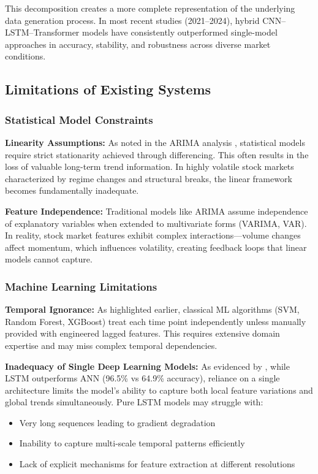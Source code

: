 This decomposition creates a more complete representation of the underlying data generation process. In most recent studies (2021--2024), hybrid CNN--LSTM--Transformer models have consistently outperformed single-model approaches in accuracy, stability, and robustness across diverse market conditions.

\subsection{Limitations of Existing Systems}

\subsubsection{Statistical Model Constraints}

\textbf{Linearity Assumptions:}
As noted in the ARIMA analysis \cite{supermarket2025}, statistical models require strict stationarity achieved through differencing. This often results in the loss of valuable long-term trend information. In highly volatile stock markets characterized by regime changes and structural breaks, the linear framework becomes fundamentally inadequate.

\textbf{Feature Independence:}
Traditional models like ARIMA assume independence of explanatory variables when extended to multivariate forms (VARIMA, VAR). In reality, stock market features exhibit complex interactions---volume changes affect momentum, which influences volatility, creating feedback loops that linear models cannot capture.

\subsubsection{Machine Learning Limitations}

\textbf{Temporal Ignorance:}
As highlighted earlier, classical ML algorithms (SVM, Random Forest, XGBoost) treat each time point independently unless manually provided with engineered lagged features. This requires extensive domain expertise and may miss complex temporal dependencies.

\textbf{Inadequacy of Single Deep Learning Models:}
As evidenced by \cite{machinefailure2024}, while LSTM outperforms ANN (96.5\% vs 64.9\% accuracy), reliance on a single architecture limits the model's ability to capture both local feature variations and global trends simultaneously. Pure LSTM models may struggle with:
\begin{itemize}
    \item Very long sequences leading to gradient degradation
    \item Inability to capture multi-scale temporal patterns efficiently
    \item Lack of explicit mechanisms for feature extraction at different resolutions
\end{itemize}

